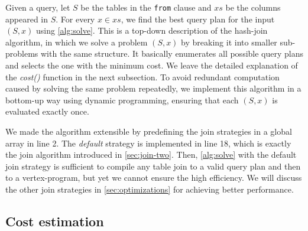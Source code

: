 \documentclass{sokendai_thesis} %
\begin{document}
Given a query, let $S$ be the tables in the \texttt{from} clause and $xs$ be the columns appeared in $S$.
For every $x\in xs$, we find the best query plan for the input $(S, x)$ using \autoref{alg:solve}.
This is a top-down description of the hash-join algorithm, in which we solve a problem $(S, x)$ by breaking it into smaller sub-problems with the same structure.
It basically enumerates all possible query plans and selects the one with the minimum cost.
We leave the detailed explanation of the \textit{cost()} function in the next subsection.
To avoid redundant computation caused by solving the same problem repeatedly, we implement this algorithm in a bottom-up way using dynamic programming, ensuring that each $(S, x)$ is evaluated exactly once.

We made the algorithm extensible by predefining the join strategies in a global array in line 2.
The \emph{default} strategy is implemented in line 18, which is exactly the join algorithm introduced in \autoref{sec:join-two}.
Then, \autoref{alg:solve} with the default join strategy is sufficient to compile any table join to a valid query plan and then to a vertex-program, but yet we cannot ensure the high efficiency.
We will discuss the other join strategies in \autoref{sec:optimizations} for achieving better performance.

\subsection{Cost estimation}
\label{sec:cost}
\end{document}
